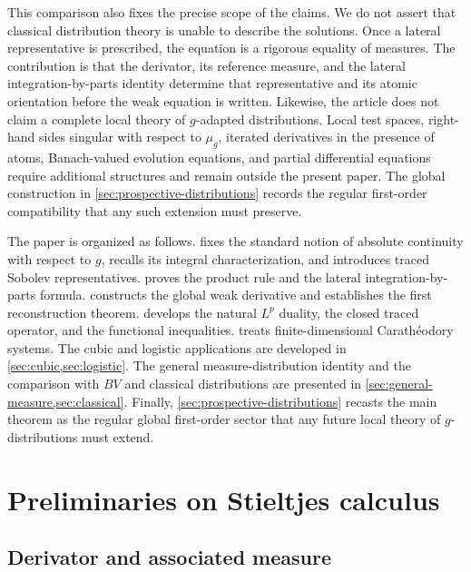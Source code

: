 \documentclass[preprint,12pt]{elsarticle}
\newenvironment{revision}{\begingroup\color{red}}{\endgroup}
\newenvironment{revision}{}{}
\theoremstyle{definition}
\theoremstyle{remark}
\begin{document}
\begin{revision}
This comparison also fixes the precise scope of the claims.  We do not assert
that classical distribution theory is unable to describe the solutions.  Once a
lateral representative is prescribed, the equation is a rigorous equality of
measures.  The contribution is that the derivator, its reference measure, and the
lateral integration-by-parts identity determine that representative and its
atomic orientation before the weak equation is written.  Likewise, the article
does not claim a complete local theory of \(g\)-adapted distributions.  Local
test spaces, right-hand sides singular with respect to \(\mu_g\), iterated
derivatives in the presence of atoms, Banach-valued evolution equations, and
partial differential equations require additional structures and remain outside
the present paper.  The global construction in
\cref{sec:prospective-distributions} records the regular first-order
compatibility that any such extension must preserve.
\end{revision}

The paper is organized as follows.  fixes the standard notion of absolute continuity with respect to $g$, recalls its integral characterization, and introduces traced Sobolev representatives.  proves the product rule and the lateral integration-by-parts formula.  constructs the global weak derivative and establishes the first reconstruction theorem.  develops the natural $L^p$ duality, the closed traced operator, and the functional inequalities.  treats finite-dimensional Carath\'eodory systems. The cubic and logistic applications are developed in \cref{sec:cubic,sec:logistic}. The general measure-distribution identity and the comparison with $BV$ and classical distributions are presented in \cref{sec:general-measure,sec:classical}. Finally, \cref{sec:prospective-distributions} recasts the main theorem as the regular global first-order sector that any future local theory of $g$-distributions must extend.

\section{Preliminaries on Stieltjes calculus}\label{sec:prelim}

\subsection{Derivator and associated measure}
\end{document}
